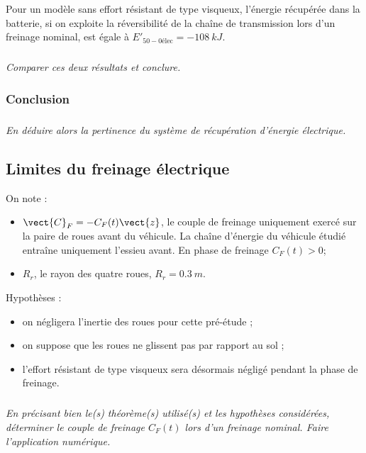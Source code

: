 \documentclass[10pt,fleqn]{article} %
\begin{document}
\begin{multicols}{2}
Pour un modèle sans effort résistant de type visqueux, l’énergie récupérée dans la batterie, si on exploite la
réversibilité de la chaîne de transmission lors d’un freinage nominal, est égale à $E'_{50-0\text{élec}} = -\SI{108}{kJ}$.

\subparagraph{}\textit{Comparer ces deux résultats et conclure.}
\ifprof
\begin{corrige}
\end{corrige}
\else
\fi

\subsubsection*{Conclusion}

\subparagraph{}\textit{En déduire alors la pertinence du système de récupération d’énergie électrique.}
\ifprof
\begin{corrige}
\end{corrige}
\else
\fi


\subsection*{Limites du freinage électrique}
On note :
\begin{itemize}
\item $\vect{C}_F = -C_F (t)\vect{z}$, le couple de freinage uniquement exercé sur la paire de roues avant du véhicule. La chaîne d’énergie du véhicule étudié entraîne uniquement l’essieu avant. En phase de freinage $C_F (t) > 0$;
\item $R_r$, le rayon des quatre roues, $R_r = \SI{0,3}{m}$.
\end{itemize}
Hypothèses :
\begin{itemize}
\item on négligera l’inertie des roues pour cette pré-étude ;
\item on suppose que les roues ne glissent pas par rapport au sol ;
\item l’effort résistant de type visqueux sera désormais négligé pendant la phase de freinage.
\end{itemize}


\subparagraph{}\textit{En précisant bien le(s) théorème(s) utilisé(s) et les hypothèses considérées, déterminer le couple de freinage $C_F (t)$ lors d’un freinage nominal. Faire l’application numérique.}
\ifprof
\begin{corrige}
\end{corrige}
\else
\fi



\end{multicols}
\end{document}
